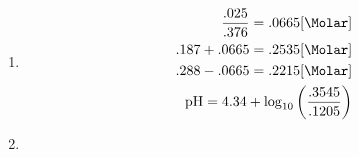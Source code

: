 \documentclass[12pt]{article}
\begin{document}
\begin{enumerate}
\begin{enumerate}
      \item {}

        \begin{equation}
          \begin{split}
            \frac{.025}{.376}=.0665[\si{\Molar}]\\
          .187+.0665=.2535[\si{\Molar}]\\
          .288-.0665=.2215[\si{\Molar}]\\
          \ce{pH}=4.34+\log_{10}\left( \frac{.3545}{.1205} \right)
          \end{split}
          \label{3}
        \end{equation}

      \item

    \end{enumerate}

\end{enumerate}
\end{document}
